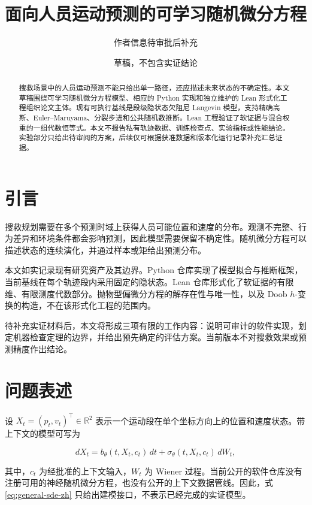 \documentclass[UTF8,11pt]{ctexart}
\title{面向人员运动预测的可学习随机微分方程}
\author{作者信息待审批后补充}
\date{草稿，不包含实证结论}
\begin{document}
\maketitle

\begin{abstract}
搜救场景中的人员运动预测不能只给出单一路径，还应描述未来状态的不确定性。本文草稿围绕可学习随机微分方程模型、相应的 Python 实现和独立维护的 Lean 形式化工程组织论文主体。现有可执行基线是段级隐状态欠阻尼 Langevin 模型，支持精确高斯、Euler--Maruyama、分裂步进和公共随机数推断。Lean 工程验证了软证据与混合权重的一组代数恒等式。本文不报告私有轨迹数据、训练检查点、实验指标或性能结论。实验部分只给出待审阅的方案，后续仅可根据获准数据和版本化运行记录补充汇总证据。
\end{abstract}

\section{引言}

搜救规划需要在多个预测时域上获得人员可能位置和速度的分布。观测不完整、行为差异和环境条件都会影响预测，因此模型需要保留不确定性。随机微分方程可以描述状态的连续演化，并通过样本或矩给出预测分布。

本文如实记录现有研究资产及其边界。Python 仓库实现了模型拟合与推断框架，当前基线在每个轨迹段内采用固定的隐状态。Lean 仓库形式化了软证据的有限维、有限测度代数部分。抛物型偏微分方程的解存在性与唯一性，以及 Doob \(h\)-变换的构造，不在该形式化工程的范围内。

待补充实证材料后，本文将形成三项有限的工作内容：说明可审计的软件实现，划定机器检查定理的边界，并给出预先确定的评估方案。当前版本不对搜救效果或预测精度作出结论。

\section{问题表述}

设 \(X_t=(p_t,v_t)^\top\in\mathbb{R}^2\) 表示一个运动段在单个坐标方向上的位置和速度状态。带上下文的模型可写为

\begin{equation}
  dX_t=b_\theta(t,X_t,c_t)\,dt+\sigma_\theta(t,X_t,c_t)\,dW_t,
  \label{eq:general-sde-zh}
\end{equation}

其中，\(c_t\) 为经批准的上下文输入，\(W_t\) 为 Wiener 过程。当前公开的软件仓库没有注册可用的神经随机微分方程，也没有公开的上下文数据管线。因此，式\eqref{eq:general-sde-zh} 只给出建模接口，不表示已经完成的实证模型。
\end{document}
